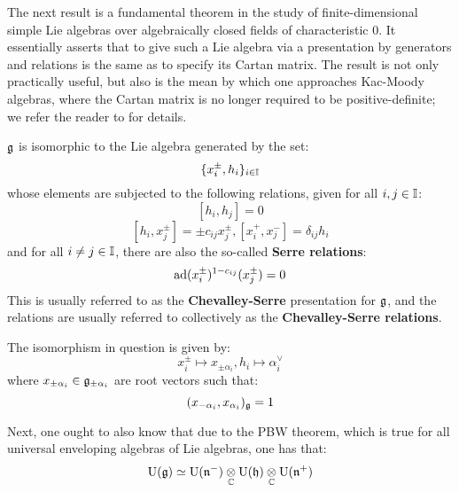        The next result is a fundamental theorem in the study of finite-dimensional simple Lie algebras over algebraically closed fields of characteristic $0$. It essentially asserts that to give such a Lie algebra via a presentation by generators and relations is the same as to specify its Cartan matrix. The result is not only practically useful, but also is the mean by which one approaches Kac-Moody algebras, where the Cartan matrix is no longer required to be positive-definite; we refer the reader to \cite[Chapters 1-8]{kac_infinite_dimensional_lie_algebras} for details. 
        \begin{theorem} \label{theorem: serre_theorem_for_finite_dimensional_simple_lie_algebras}
            $\mathfrak{g}$ is isomorphic to the Lie algebra generated by the set:
                $$\{x_i^{\pm}, h_i\}_{i \in \mathbb{I}}$$
            whose elements are subjected to the following relations, given for all $i, j \in \mathbb{I}$:
                $$[h_i, h_j] = 0$$
                $$[h_i, x_j^{\pm}] = \pm c_{ij} x_j^{\pm}, [x_i^+, x_j^-] = \delta_{ij} h_i$$
            and for all $i \not = j \in \mathbb{I}$, there are also the so-called \textbf{Serre relations}:
                $$\mathrm{ad}(x_i^{\pm})^{1 - c_{ij}}(x_j^{\pm}) = 0$$
            This is usually referred to as the \textbf{Chevalley-Serre} presentation for $\mathfrak{g}$, and the relations are usually referred to collectively as the \textbf{Chevalley-Serre relations}.

            The isomorphism in question is given by:
                $$x_i^{\pm} \mapsto x_{\pm \alpha_i}, h_i \mapsto \alpha_i^{\vee}$$
            where $x_{\pm \alpha_i} \in \mathfrak{g}_{\pm \alpha_i}$ are root vectors such that:
                $$(x_{-\alpha_i}, x_{\alpha_i})_{\mathfrak{g}} = 1$$
        \end{theorem}

        Next, one ought to also know that due to the PBW theorem, which is true for all universal enveloping algebras of Lie algebras, one has that:
            $$\rmU(\g) \cong \rmU(\n^-) \tensor_{\bbC} \rmU(\h) \tensor_{\bbC} \rmU(\n^+)$$

